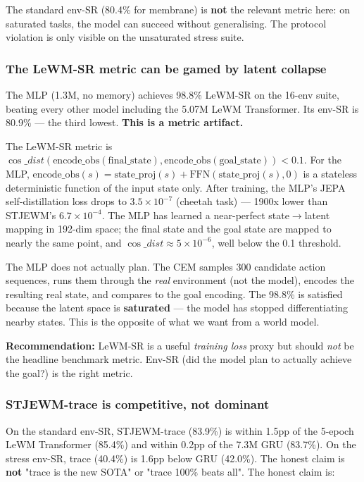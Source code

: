 \documentclass{article}
\begin{document}
The standard env-SR (80.4\% for membrane) is \textbf{not} the relevant
metric here: on saturated tasks, the model can succeed without
generalising. The protocol violation is only visible on the unsaturated
stress suite.

\subsubsection{The LeWM-SR metric can be gamed by latent collapse}

The MLP (1.3M, no memory) achieves 98.8\% LeWM-SR on the 16-env suite,
beating every other model including the 5.07M LeWM Transformer. Its
env-SR is 80.9\% — the third lowest. \textbf{This is a metric artifact.}

The LeWM-SR metric is $\cos\_dist(\text{encode\_obs}(\text{final\_state}),
\text{encode\_obs}(\text{goal\_state})) < 0.1$. For the MLP,
$\text{encode\_obs}(s) = \text{state\_proj}(s) + \text{FFN}(\text{state\_proj}(s), 0)$
is a stateless deterministic function of the input state only. After
training, the MLP's JEPA self-distillation loss drops to $3.5 \times 10^{-7}$
(cheetah task) — 1900x lower than STJEWM's $6.7 \times 10^{-4}$. The
MLP has learned a near-perfect state$\to$latent mapping in 192-dim space;
the final state and the goal state are mapped to nearly the same
point, and $\cos\_dist \approx 5 \times 10^{-6}$, well below the 0.1
threshold.

The MLP does not actually plan. The CEM samples 300 candidate action
sequences, runs them through the \emph{real} environment (not the model),
encodes the resulting real state, and compares to the goal encoding.
The 98.8\% is satisfied because the latent space is \textbf{saturated}
— the model has stopped differentiating nearby states. This is the
opposite of what we want from a world model.

\textbf{Recommendation:} LeWM-SR is a useful \emph{training loss} proxy
but should \emph{not} be the headline benchmark metric. Env-SR
(did the model plan to actually achieve the goal?) is the right
metric.

\subsubsection{STJEWM-trace is competitive, not dominant}

On the standard env-SR, STJEWM-trace (83.9\%) is within 1.5pp of
the 5-epoch LeWM Transformer (85.4\%) and within 0.2pp of the 7.3M
GRU (83.7\%). On the stress env-SR, trace (40.4\%) is 1.6pp below GRU
(42.0\%). The honest claim is \textbf{not} "trace is the new SOTA" or
"trace 100\% beats all". The honest claim is:
\end{document}
